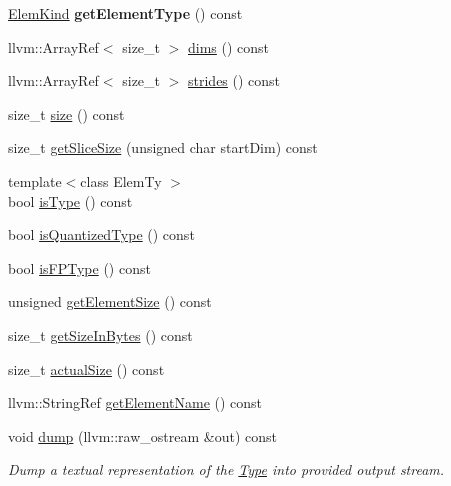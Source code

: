 \begin{DoxyCompactItemize}
\hyperlink{namespaceglow_ab92e14a94329daf4083db670e95fbcdf}{Elem\+Kind} {\bfseries get\+Element\+Type} () const
\item 
llvm\+::\+Array\+Ref$<$ size\+\_\+t $>$ \hyperlink{structglow_1_1_type_abf3890a5fdcd39b5c221a513a15c5461}{dims} () const
\item 
llvm\+::\+Array\+Ref$<$ size\+\_\+t $>$ \hyperlink{structglow_1_1_type_ab3f576c25f30f6fbe676408f4794c809}{strides} () const
\item 
size\+\_\+t \hyperlink{structglow_1_1_type_a8850574b9dff16a354465946ecabb861}{size} () const
\item 
size\+\_\+t \hyperlink{structglow_1_1_type_a612cc055d21d2e7402b0859f5dce35b2}{get\+Slice\+Size} (unsigned char start\+Dim) const
\item 
{\footnotesize template$<$class Elem\+Ty $>$ }\\bool \hyperlink{structglow_1_1_type_a07c025fdb2c0140b7906f3689fe7c175}{is\+Type} () const
\item 
bool \hyperlink{structglow_1_1_type_a2b57c85b1cbe5d83c7a13c3a60c242e8}{is\+Quantized\+Type} () const
\item 
bool \hyperlink{structglow_1_1_type_a3e5b4d7754eb3d94b85eac664235ad67}{is\+F\+P\+Type} () const
\item 
unsigned \hyperlink{structglow_1_1_type_a3bfc737652264de3d997632d0b01ac63}{get\+Element\+Size} () const
\item 
size\+\_\+t \hyperlink{structglow_1_1_type_a136383839b7414ad54835c1b3574b858}{get\+Size\+In\+Bytes} () const
\item 
size\+\_\+t \hyperlink{structglow_1_1_type_a7c624c2c77ac264040f362aeac219eae}{actual\+Size} () const
\item 
llvm\+::\+String\+Ref \hyperlink{structglow_1_1_type_a5eea8e5642ad38fa096c764b8740767f}{get\+Element\+Name} () const
\item 
\mbox{\label{structglow_1_1_type_a0441e0e83e3cfa44a5f4f850a0d67ad8}} 
void \hyperlink{structglow_1_1_type_a0441e0e83e3cfa44a5f4f850a0d67ad8}{dump} (llvm\+::raw\+\_\+ostream \&out) const
\begin{DoxyCompactList}\small\item\em Dump a textual representation of the \hyperlink{structglow_1_1_type}{Type} into provided output stream. \end{DoxyCompactList}\item 
\mbox{\label{structglow_1_1_type_a818731a6939730c60f885d686f495a22}} 

\end{DoxyCompactItemize}
